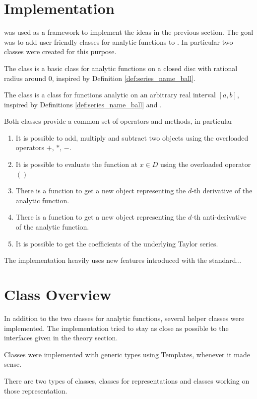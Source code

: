 	\section{Implementation}
		\irram was used as a framework to implement the ideas in the previous section.
		The goal was to add user friendly classes for analytic functions to \irram.
		In particular two classes were created for this purpose.

		The class \baana is a basic class for analytic functions on 
		a closed disc with rational radius around $0$, inspired by Definition \ref{def:series_name_ball}.

		The class \anarect is a class for functions analytic on an arbitrary real interval $[a,b]$, 
		inspired by Definitions \ref{def:series_name_ball} and \label{def:series_name_rect}.

		Both classes provide a common set of operators and methods, in particular
		\begin{enumerate}
			\item It is possible to add, multiply and subtract two objects using the overloaded operators $+$, $*$, $-$.
			\item It is possible to evaluate the function at $x \in D$ using the overloaded operator $()$
			\item There is a function  to get a new object representing the $d$-th derivative of the analytic function.
			\item There is a function  to get a new object representing the $d$-th anti-derivative of the analytic function.
			\item It is possible to get the coefficients of the underlying Taylor series.
		\end{enumerate}

		The implementation heavily uses new features introduced with the \ccx standard...

	\section{Class Overview}
		In addition to the two classes for analytic functions, several helper classes were implemented.
		The implementation tried to stay as close as possible to the interfaces given in the theory section.

		Classes were implemented with generic types using Templates, whenever it made sense.

 		There are two types of classes, classes for representations and classes working on those representation.

